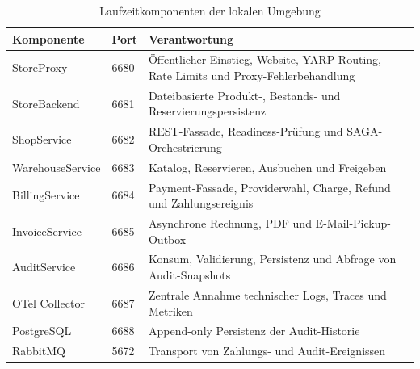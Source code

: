 \documentclass[10pt,a4paper]{article}
\begin{document}
\begin{table}[H]
\centering
\small
\begin{tabularx}{\textwidth}{@{}p{30mm}p{14mm}Y@{}}
  \toprule
  \textbf{\sffamily Komponente} & \textbf{\sffamily Port} &
    \textbf{\sffamily Verantwortung}\\
  \midrule
  StoreProxy & 6680 & Öffentlicher Einstieg, Website, YARP-Routing,
    Rate Limits und Proxy-Fehlerbehandlung\\
  StoreBackend & 6681 & Dateibasierte Produkt-, Bestands- und
    Reservierungspersistenz\\
  ShopService & 6682 & REST-Fassade, Readiness-Prüfung und
    SAGA-Orchestrierung\\
  WarehouseService & 6683 & Katalog, Reservieren, Ausbuchen und Freigeben\\
  BillingService & 6684 & Payment-Fassade, Providerwahl, Charge, Refund und
    Zahlungsereignis\\
  InvoiceService & 6685 & Asynchrone Rechnung, PDF und E-Mail-Pickup-Outbox\\
  AuditService & 6686 & Konsum, Validierung, Persistenz und Abfrage von
    Audit-Snapshots\\
  OTel Collector & 6687 & Zentrale Annahme technischer Logs, Traces und
    Metriken\\
  PostgreSQL & 6688 & Append-only Persistenz der Audit-Historie\\
  RabbitMQ & 5672 & Transport von Zahlungs- und Audit-Ereignissen\\
  \bottomrule
\end{tabularx}
\caption{Laufzeitkomponenten der lokalen Umgebung}
\end{table}
\end{document}
